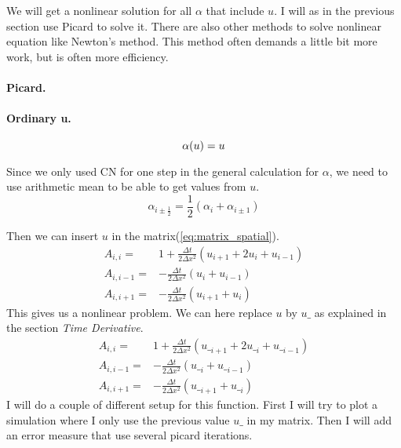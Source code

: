 \documentclass{article}
\begin{document}
We will get a nonlinear solution for all $\alpha$ that include $u$. 
I will as in the previous section use Picard to solve it. There are also
other methods to solve nonlinear equation like Newton's method. This method often demands
a little bit more work, but is often more efficiency. 

\paragraph{Picard.}

\paragraph{Ordinary u.}
\begin{equation}
	\alpha(u) = u\\
\end{equation}

Since we only used CN for one step in the general calculation for $\alpha$, we need to use arithmetic mean
to be able to get values from $u$.
\begin{equation*}
	\alpha_{i\pm\frac{1}{2}} =\frac{1}{2}(\alpha_i+\alpha_{i\pm1}) 
\end{equation*}

Then we can insert $u$ in the matrix(\ref{eq:matrix_spatial}).
\begin{align*} 
A_{i,i} =& 1+\frac{\Delta t}{2\Delta x^2}(u_{i+1}+2u_{i}+u_{i-1})\\
A_{i,i-1} =&-\frac{\Delta t}{2\Delta x^2}(u_{i}+u_{i-1})\\
A_{i,i+1} =&-\frac{\Delta t}{2\Delta x^2}(u_{i+1}+u_{i})
\end{align*}                               
This gives us a nonlinear problem. We can here replace $u$ by $u\_$
as explained in the section \emph{Time Derivative}.
\begin{align*} 
A_{i,i} =& 1+\frac{\Delta t}{2\Delta x^2}(u\__{i+1}+2u\__{i}+u\__{i-1})\\
A_{i,i-1} =&-\frac{\Delta t}{2\Delta x^2}(u\__{i}+u\__{i-1})\\
A_{i,i+1} =&-\frac{\Delta t}{2\Delta x^2}(u\__{i+1}+u\__{i})
\end{align*}                               
I will do a couple of different setup for this function. First I will try to plot
a simulation where I only use the previous value $u\_$ in my matrix. Then I will add
an error measure that use several picard iterations.

\end{document}
